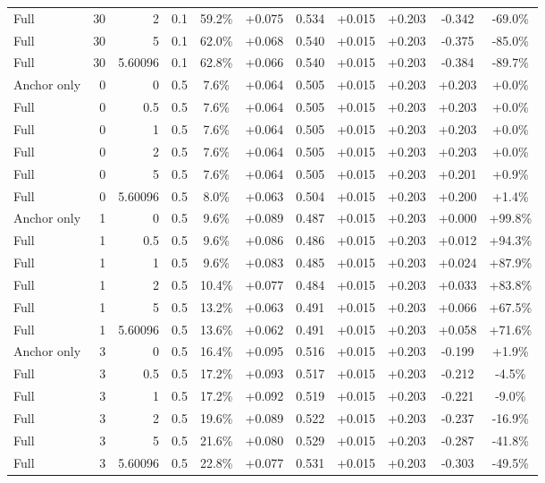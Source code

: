 \begin{table}[htbp]
\begin{tabular}{lrrrccccccc}
Full & 30 & 2 & 0.1 & 59.2\% & +0.075 & 0.534 & +0.015 & +0.203 & -0.342 & -69.0\% \\
Full & 30 & 5 & 0.1 & 62.0\% & +0.068 & 0.540 & +0.015 & +0.203 & -0.375 & -85.0\% \\
Full & 30 & 5.60096 & 0.1 & 62.8\% & +0.066 & 0.540 & +0.015 & +0.203 & -0.384 & -89.7\% \\
Anchor only & 0 & 0 & 0.5 & 7.6\% & +0.064 & 0.505 & +0.015 & +0.203 & +0.203 & +0.0\% \\
Full & 0 & 0.5 & 0.5 & 7.6\% & +0.064 & 0.505 & +0.015 & +0.203 & +0.203 & +0.0\% \\
Full & 0 & 1 & 0.5 & 7.6\% & +0.064 & 0.505 & +0.015 & +0.203 & +0.203 & +0.0\% \\
Full & 0 & 2 & 0.5 & 7.6\% & +0.064 & 0.505 & +0.015 & +0.203 & +0.203 & +0.0\% \\
Full & 0 & 5 & 0.5 & 7.6\% & +0.064 & 0.505 & +0.015 & +0.203 & +0.201 & +0.9\% \\
Full & 0 & 5.60096 & 0.5 & 8.0\% & +0.063 & 0.504 & +0.015 & +0.203 & +0.200 & +1.4\% \\
Anchor only & 1 & 0 & 0.5 & 9.6\% & +0.089 & 0.487 & +0.015 & +0.203 & +0.000 & +99.8\% \\
Full & 1 & 0.5 & 0.5 & 9.6\% & +0.086 & 0.486 & +0.015 & +0.203 & +0.012 & +94.3\% \\
Full & 1 & 1 & 0.5 & 9.6\% & +0.083 & 0.485 & +0.015 & +0.203 & +0.024 & +87.9\% \\
Full & 1 & 2 & 0.5 & 10.4\% & +0.077 & 0.484 & +0.015 & +0.203 & +0.033 & +83.8\% \\
Full & 1 & 5 & 0.5 & 13.2\% & +0.063 & 0.491 & +0.015 & +0.203 & +0.066 & +67.5\% \\
Full & 1 & 5.60096 & 0.5 & 13.6\% & +0.062 & 0.491 & +0.015 & +0.203 & +0.058 & +71.6\% \\
Anchor only & 3 & 0 & 0.5 & 16.4\% & +0.095 & 0.516 & +0.015 & +0.203 & -0.199 & +1.9\% \\
Full & 3 & 0.5 & 0.5 & 17.2\% & +0.093 & 0.517 & +0.015 & +0.203 & -0.212 & -4.5\% \\
Full & 3 & 1 & 0.5 & 17.2\% & +0.092 & 0.519 & +0.015 & +0.203 & -0.221 & -9.0\% \\
Full & 3 & 2 & 0.5 & 19.6\% & +0.089 & 0.522 & +0.015 & +0.203 & -0.237 & -16.9\% \\
Full & 3 & 5 & 0.5 & 21.6\% & +0.080 & 0.529 & +0.015 & +0.203 & -0.287 & -41.8\% \\
Full & 3 & 5.60096 & 0.5 & 22.8\% & +0.077 & 0.531 & +0.015 & +0.203 & -0.303 & -49.5\% \\

\end{tabular}
\end{table}
